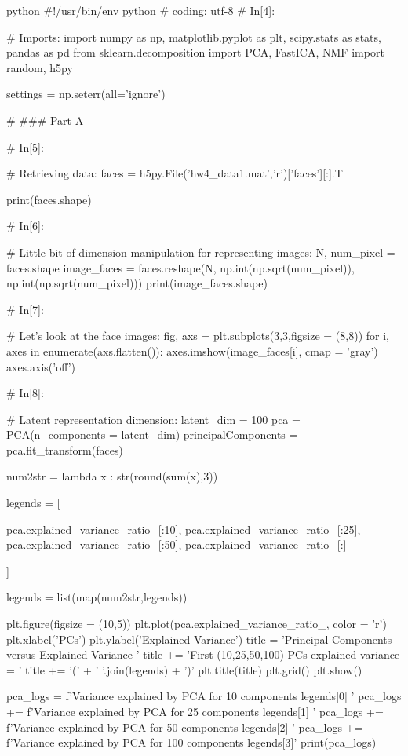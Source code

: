 \documentclass[12pt]{amsart}
\begin{document}
\begin{mintedbox}{python}
#!/usr/bin/env python
# coding: utf-8
# In[4]:


# Imports:
import numpy as np, matplotlib.pyplot as plt, scipy.stats as stats, pandas as pd
from sklearn.decomposition import PCA, FastICA, NMF
import random, h5py

settings = np.seterr(all='ignore')


# ### Part A

# In[5]:


# Retrieving data:
faces = h5py.File('hw4_data1.mat','r')['faces'][:].T

print(faces.shape)


# In[6]:


# Little bit of dimension manipulation for representing images:
N, num_pixel = faces.shape
image_faces = faces.reshape(N, np.int(np.sqrt(num_pixel)), np.int(np.sqrt(num_pixel)))
print(image_faces.shape)


# In[7]:


# Let's look at the face images:
fig, axs = plt.subplots(3,3,figsize = (8,8))
for i, axes in enumerate(axs.flatten()):
    axes.imshow(image_faces[i], cmap = 'gray')
    axes.axis('off')


# In[8]:


# Latent representation dimension:
latent_dim = 100
pca = PCA(n_components = latent_dim)
principalComponents = pca.fit_transform(faces)

num2str = lambda x : str(round(sum(x),3))

legends = [

    pca.explained_variance_ratio_[:10],
    pca.explained_variance_ratio_[:25],
    pca.explained_variance_ratio_[:50],
    pca.explained_variance_ratio_[:]

]

legends = list(map(num2str,legends))

plt.figure(figsize = (10,5))
plt.plot(pca.explained_variance_ratio_, color = 'r')
plt.xlabel('PCs')
plt.ylabel('Explained Variance')
title = 'Principal Components versus Explained Variance \n'
title += 'First (10,25,50,100) PCs explained variance = '
title += '('  + ' '.join(legends) + ')'
plt.title(title)
plt.grid()
plt.show()


pca_logs = f'Variance explained by PCA for 10 components  {legends[0]} \n'
pca_logs += f'Variance explained by PCA for 25 components  {legends[1]} \n'
pca_logs += f'Variance explained by PCA for 50 components  {legends[2]} \n'
pca_logs += f'Variance explained by PCA for 100 components {legends[3]}'
print(pca_logs)



\end{mintedbox}
\end{document}
